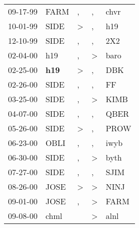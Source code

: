 \begin{supertabular}{p{0.07\textwidth}p{0.06\textwidth}p{0.02\textwidth}p{0.02\textwidth}p{0.06\textwidth}}
 09-17-99\textsuperscript{} &           FARM\textsuperscript{} &                , &                , &           chvr\textsuperscript{} \\
 10-01-99\textsuperscript{} &           SIDE\textsuperscript{} &     \textgreater &                , &            h19\textsuperscript{} \\
 12-10-99\textsuperscript{} &           SIDE\textsuperscript{} &                , &                , &            2X2\textsuperscript{} \\
 02-04-00\textsuperscript{} &            h19\textsuperscript{} &                , &     \textgreater &           baro\textsuperscript{} \\
 02-25-00\textsuperscript{} &   \textbf{h19\textsuperscript{}} &     \textgreater &                , &            DBK\textsuperscript{} \\
 02-26-00\textsuperscript{} &           SIDE\textsuperscript{} &                , &                , &             FF\textsuperscript{} \\
 03-25-00\textsuperscript{} &           SIDE\textsuperscript{} &                , &     \textgreater &           KIMB\textsuperscript{} \\
 04-07-00\textsuperscript{} &           SIDE\textsuperscript{} &                , &                , &           QBER\textsuperscript{} \\
 05-26-00\textsuperscript{} &           SIDE\textsuperscript{} &     \textgreater &                , &           PROW\textsuperscript{} \\
 06-23-00\textsuperscript{} &           OBLI\textsuperscript{} &                , &                , &           iwyb\textsuperscript{} \\
 06-30-00\textsuperscript{} &           SIDE\textsuperscript{} &                , &     \textgreater &           byth\textsuperscript{} \\
 07-27-00\textsuperscript{} &           SIDE\textsuperscript{} &                , &                , &           SJIM\textsuperscript{} \\
 08-26-00\textsuperscript{} &           JOSE\textsuperscript{} &     \textgreater &     \textgreater &           NINJ\textsuperscript{} \\
 09-01-00\textsuperscript{} &           JOSE\textsuperscript{} &                , &     \textgreater &           FARM\textsuperscript{} \\
 09-08-00\textsuperscript{} &           chml\textsuperscript{} &                  &     \textgreater &           alnl\textsuperscript{} \\

\end{supertabular}
